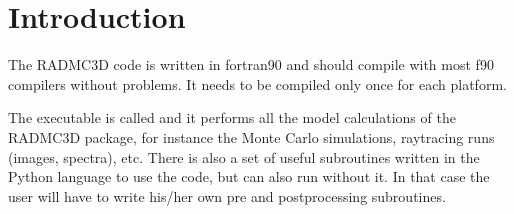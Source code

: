 \documentclass[letterpaper,10pt,english]{sphinxmanual}
\begin{document}
\section{Introduction}
\label{\detokenize{overview:introduction}}
The RADMC\sphinxhyphen{}3D code is written in fortran\sphinxhyphen{}90 and should compile with most f90
compilers without problems. It needs to be compiled only once for each
platform.

The executable is called  and it performs all the model
calculations of the RADMC\sphinxhyphen{}3D package, for instance the Monte Carlo simulations,
ray\sphinxhyphen{}tracing runs (images, spectra), etc. There is also a set of useful
subroutines written in the Python language to use the  code,
but  can also run without it. In that case the user will
have to write his/her own pre\sphinxhyphen{} and post\sphinxhyphen{}processing subroutines.
\end{document}
